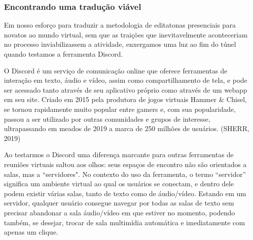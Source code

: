 \subsubsection{Encontrando uma tradução viável}

Em nosso esforço para traduzir a metodologia de editatonas presenciais para novatos ao mundo virtual, sem que as traições que inevitavelmente aconteceriam no processo inviabilizassem a atividade, enxergamos uma luz ao fim do túnel quando testamos a ferramenta Discord.

O Discord é um serviço de comunicação online que oferece ferramentas de interação em texto, áudio e vídeo, assim como compartilhamento de tela, e pode ser acessado tanto através de seu aplicativo próprio como através de um webapp em seu site. Criado em 2015 pela produtora de jogos virtuais Hammer \& Chisel, se tornou rapidamente muito popular entre gamers e, com sua popularidade, passou a ser utilizado por outras comunidades e grupos de interesse, ultrapassando em meados de 2019 a marca de 250 milhões de usuários. (SHERR, 2019)

Ao testarmos o Discord uma diferença marcante para outras ferramentas de reuniões virtuais saltou aos olhos: seus espaços de encontro não são orientados a salas, mas a “servidores". No contexto do uso da ferramenta, o termo “servidor” significa um ambiente virtual ao qual os usuários se conectam, e dentro dele podem existir várias salas, tanto de texto como de áudio/vídeo. Estando em um servidor, qualquer usuário consegue navegar por todas as salas de texto sem precisar abandonar a sala áudio/vídeo em que estiver no momento, podendo também, se desejar, trocar de sala multimídia automática e imediatamente com apenas um clique.


